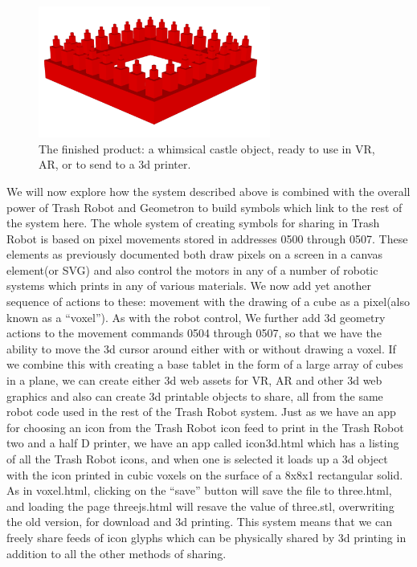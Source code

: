 \begin{figure}
	\centering
	\includegraphics[width=3in]{figures/geometron3d/whimsycastle.png}
	\caption[whimsycastle]
	{The finished product: a whimsical castle object, ready to use in VR, AR, or to send to a 3d printer.}
\end{figure}


We will now explore how the system described above is combined with the overall power of Trash Robot and Geometron to build symbols which link to the rest of the system here.  The whole system of creating symbols for sharing in Trash Robot is based on pixel movements stored in addresses 0500 through 0507.  These elements as previously documented both draw pixels on a screen in a canvas element(or SVG) and also control the motors in any of a number of robotic systems which prints in any of various materials.  We now add yet another sequence of actions to these: movement with the drawing of a cube as a pixel(also known as a ``voxel'').  As with the robot control, We further add 3d geometry actions to the movement commands 0504 through 0507, so that we have the ability to move the 3d cursor around either with or without drawing a voxel.  If we combine this with creating a base tablet in the form of a large array of cubes in a plane, we can create either 3d web assets for VR, AR and other 3d web graphics and also can create 3d printable objects to share, all from the same robot code used in the rest of the Trash Robot system.  Just as we have an app for choosing an icon from the Trash Robot icon feed to print in the Trash Robot two and a half D printer, we have an app called icon3d.html which has a listing of all the Trash Robot icons, and when one is selected it loads up a 3d object with the icon printed in cubic voxels on the surface of a 8x8x1 rectangular solid.  As in voxel.html, clicking on the ``save'' button will  save the file to three.html, and loading the page threejs.html will resave the value of three.stl, overwriting the old version, for download and 3d printing.  This system means that we can freely share feeds of icon glyphs which can be physically shared by 3d printing in addition to all the other methods of sharing.  


